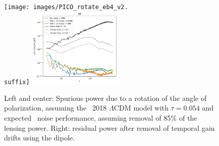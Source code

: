 \documentclass[PICOReport.tex]{subfiles}
\begin{document}
\begin{figure}[htb]
\texttt{[image: images/PICO\_rotate\_eb4\_v2.\\suffix]} \includegraphics[width=0.4\textwidth]{images/calibration_spectrum_BB.pdf}
\caption{\captiontext
Left and center: Spurious power due to a rotation of the angle of polarization, assuming the \planck~2018 $\Lambda$CDM model \citep{Planck2018_VI} with $\tau=0.054$ and expected \pico\ noise performance, assuming removal of 85\% of the lensing power.  Right: residual power after removal of temporal gain drifts using the dipole.
\label{fig:rot_bb_tb_eb} }
\end{figure}
%
\end{document}
